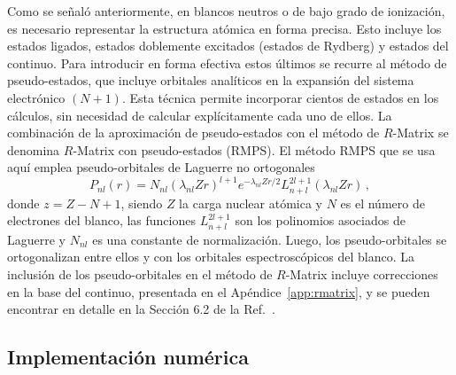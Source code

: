 Como se señaló anteriormente, en blancos neutros o de bajo grado de 
ionización, es necesario representar la estructura atómica en forma 
precisa. Esto incluye los estados ligados, estados doblemente excitados 
(estados de Rydberg) y estados del continuo. 
Para introducir en forma efectiva estos últimos se recurre al método de 
pseudo-estados, que incluye orbitales analíticos en la expansión del 
sistema electrónico \mbox{$(N+1)$.} 
Esta técnica permite incorporar cientos de estados en los cálculos, sin 
necesidad de calcular explícitamente cada uno de ellos. 
La combinación de la aproximación de pseudo-estados con el método de 
$R$-Matrix se denomina $R$-Matrix con pseudo-estados (RMPS). El método 
RMPS que se usa aquí emplea pseudo-orbitales de Laguerre 
no ortogonales 
\begin{equation}
P_{nl}(r) = N_{nl}(\lambda_{nl}Zr)^{l+1} e^{-\lambda_{nl}Zr/2} 
L_{n+l}^{2l+1}(\lambda_{nl}Zr)\,,
\label{eq:pseudo}
\end{equation}
donde $z=Z-N+1$, siendo $Z$ la carga nuclear atómica y $N$ es el número 
de electrones del blanco, las funciones $L_{n+l}^{2l+1}$ son los 
polinomios asociados de Laguerre y $N_{nl}$ es una constante de 
normalización. Luego, los pseudo-orbitales se ortogonalizan entre ellos
y con los orbitales espectroscópicos del blanco. La inclusión de los 
pseudo-orbitales en el método de $R$-Matrix incluye correcciones en la 
base del continuo, presentada en el Apéndice~\ref{app:rmatrix}, y se 
pueden encontrar en detalle en la Sección 6.2 de la Ref.~\cite{Burke:11}.

\subsection{Implementación numérica}

